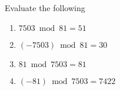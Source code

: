 \begin{statement}{1.1}
Evaluate the following
\end{statement}
\begin{enumerate}[label=(\alph*)]
\item  $7503 \bmod 81 = 51$
\item $(-7503) \bmod 81 = 30$
\item $81 \bmod 7503 = 81$
\item $(-81) \bmod 7503 = 7422$
\end{enumerate}
